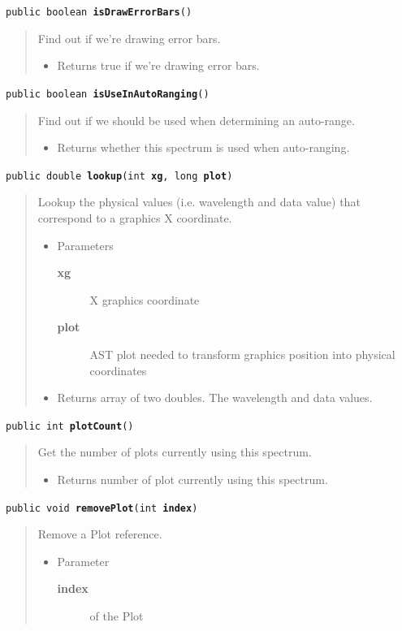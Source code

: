 \documentclass[twoside,11pt]{article}
\renewcommand{\_}{\texttt{\symbol{95}}}
\newcommand{\method}[1]{\texttt{#1}}
\newenvironment{desc}{\begin{quote}}{\end{quote}}
\begin{document}
\method{public boolean \textbf{isDrawErrorBars}()\label{l83}\label{l84}}
\begin{desc}Find out if we're drawing error bars.
\begin{itemize}
\item{Returns true if we're drawing error bars. }
\end{itemize}
\end{desc}

\method{public boolean \textbf{isUseInAutoRanging}()\label{l85}\label{l86}}
\begin{desc}Find out if we should be used when determining an auto-range.
\begin{itemize}
\item{Returns whether this spectrum is used when auto-ranging. }
\end{itemize}
\end{desc}

\method{public double \textbf{lookup}(\texttt{int} \textbf{xg}, \texttt{long} \textbf{plot})\label{l87}\label{l88}}
\begin{desc}Lookup the physical values (i.e. wavelength and data value)
 that correspond to a graphics X coordinate.
\begin{itemize}
\item{Parameters
  \begin{description}
   \item[\textbf{xg}]{X graphics coordinate}
   \item[\textbf{plot}]{AST plot needed to transform graphics position
             into physical coordinates}
  \end{description}}
\end{itemize}
\begin{itemize}
\item{Returns array of two doubles. The wavelength and data values. }
\end{itemize}
\end{desc}

\method{public int \textbf{plotCount}()\label{l89}\label{l90}}
\begin{desc}Get the number of plots currently using this spectrum.
\begin{itemize}
\item{Returns number of plot currently using this spectrum. }
\end{itemize}
\end{desc}

\method{public void \textbf{removePlot}(\texttt{int} \textbf{index})\label{l91}\label{l92}}
\begin{desc}Remove a Plot reference.
\begin{itemize}
\item{Parameter
  \begin{description}
   \item[\textbf{index}]{of the Plot}
  \end{description}}
\end{itemize}
\end{desc}
\end{document}
